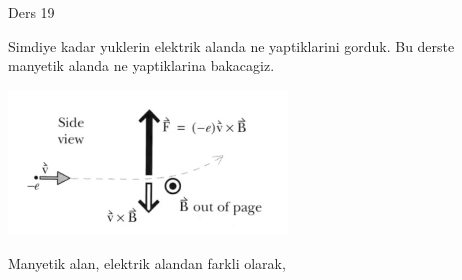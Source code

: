 \documentclass[12pt,fleqn]{article}\usepackage{../../common}
\begin{document}
Ders 19

Simdiye kadar yuklerin elektrik alanda ne yaptiklarini gorduk. Bu derste
manyetik alanda ne yaptiklarina bakacagiz. 

\includegraphics[width=20em]{19_01.png}

Manyetik alan, elektrik alandan farkli olarak, 
\end{document}
